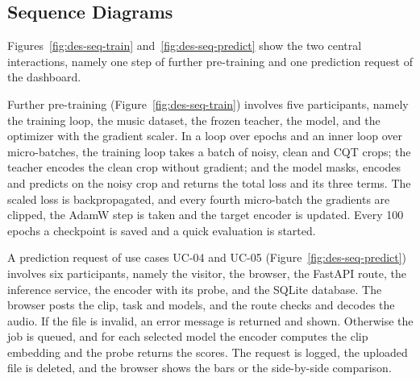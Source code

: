\documentclass{FastFyp}
\begin{document}
\subsection{Sequence Diagrams}
Figures~\ref{fig:des-seq-train} and~\ref{fig:des-seq-predict} show the two central interactions, namely one step of further pre-training and one prediction request of the dashboard.

Further pre-training (Figure~\ref{fig:des-seq-train}) involves five participants, namely the training loop, the music dataset, the frozen teacher, the model, and the optimizer with the gradient scaler. In a loop over epochs and an inner loop over micro-batches, the training loop takes a batch of noisy, clean and CQT crops; the teacher encodes the clean crop without gradient; and the model masks, encodes and predicts on the noisy crop and returns the total loss and its three terms. The scaled loss is backpropagated, and every fourth micro-batch the gradients are clipped, the AdamW step is taken and the target encoder is updated. Every 100 epochs a checkpoint is saved and a quick evaluation is started.

A prediction request of use cases UC-04 and UC-05 (Figure~\ref{fig:des-seq-predict}) involves six participants, namely the visitor, the browser, the FastAPI route, the inference service, the encoder with its probe, and the SQLite database. The browser posts the clip, task and models, and the route checks and decodes the audio. If the file is invalid, an error message is returned and shown. Otherwise the job is queued, and for each selected model the encoder computes the clip embedding and the probe returns the scores. The request is logged, the uploaded file is deleted, and the browser shows the bars or the side-by-side comparison.
\end{document}
